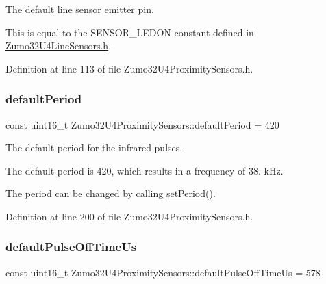 The default line sensor emitter pin. 

This is equal to the S\+E\+N\+S\+O\+R\+\_\+\+L\+E\+D\+ON constant defined in \hyperlink{_zumo32_u4_line_sensors_8h}{Zumo32\+U4\+Line\+Sensors.\+h}. 

Definition at line 113 of file Zumo32\+U4\+Proximity\+Sensors.\+h.

\mbox{\label{class_zumo32_u4_proximity_sensors_a0857da91ca57c4f884094736bd1c0824}} 
\subsubsection{\texorpdfstring{default\+Period}{defaultPeriod}}
{\footnotesize\ttfamily const uint16\+\_\+t Zumo32\+U4\+Proximity\+Sensors\+::default\+Period = 420\hspace{0.3cm}{\ttfamily [static]}}



The default period for the infrared pulses. 

The default period is 420, which results in a frequency of 38. k\+Hz.

The period can be changed by calling \hyperlink{class_zumo32_u4_proximity_sensors_ab288aeae9bcc5933cede8941b709b4fc}{set\+Period()}. 

Definition at line 200 of file Zumo32\+U4\+Proximity\+Sensors.\+h.

\mbox{\label{class_zumo32_u4_proximity_sensors_a60fcba68f8cc7f2710f32ac76de85cdf}} 
\subsubsection{\texorpdfstring{default\+Pulse\+Off\+Time\+Us}{defaultPulseOffTimeUs}}
{\footnotesize\ttfamily const uint16\+\_\+t Zumo32\+U4\+Proximity\+Sensors\+::default\+Pulse\+Off\+Time\+Us = 578\hspace{0.3cm}{\ttfamily [static]}}



